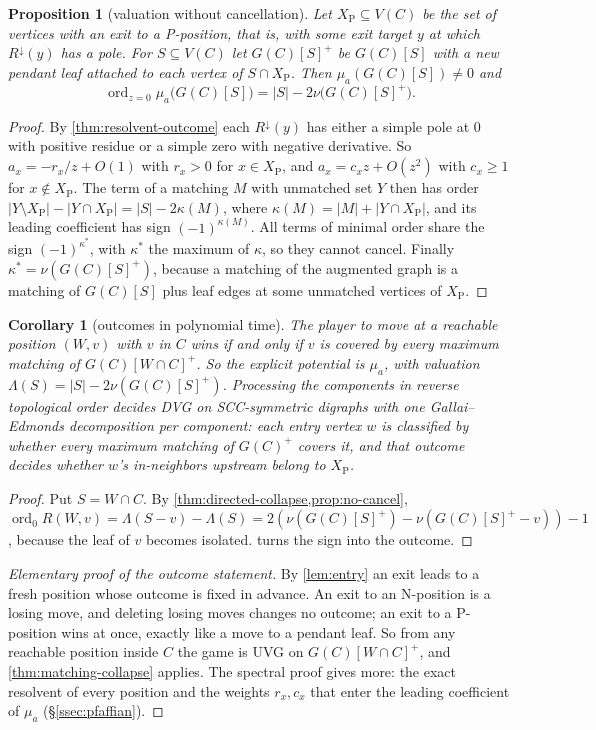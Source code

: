 \documentclass[11pt]{amsart}
\theoremstyle{plain}
\newtheorem{proposition}[theorem]{Proposition}
\newtheorem{corollary}[theorem]{Corollary}
\theoremstyle{definition}
\theoremstyle{remark}
\numberwithin{equation}{section}
\newcommand{\ord}{\operatorname{ord}}
\newcommand{\Rdown}{R^{\downarrow}}
\newcommand{\Pw}{\mathrm{P}}   %
\begin{document}
\begin{proposition}[valuation without cancellation]\label{prop:no-cancel}
Let $X_{\Pw}\subseteq V(C)$ be the set of vertices with an exit to a P-position, that is, with some exit target $y$ at which $\Rdown(y)$ has a pole. For $S\subseteq V(C)$ let $G(C)[S]^{+}$ be $G(C)[S]$ with a new pendant leaf attached to each vertex of $S\cap X_{\Pw}$. Then $\mu_a(G(C)[S])\neq0$ and
\[
\ord_{z=0}\mu_a\bigl(G(C)[S]\bigr)=|S|-2\nu\bigl(G(C)[S]^{+}\bigr).
\]
\end{proposition}
\begin{proof}
By \cref{thm:resolvent-outcome} each $\Rdown(y)$ has either a simple pole at $0$ with positive residue or a simple zero with negative derivative. So $a_x=-r_x/z+O(1)$ with $r_x>0$ for $x\in X_{\Pw}$, and $a_x=c_xz+O(z^2)$ with $c_x\ge1$ for $x\notin X_{\Pw}$. The term of a matching $M$ with unmatched set $Y$ then has order $|Y\setminus X_{\Pw}|-|Y\cap X_{\Pw}|=|S|-2\kappa(M)$, where $\kappa(M)=|M|+|Y\cap X_{\Pw}|$, and its leading coefficient has sign $(-1)^{\kappa(M)}$. All terms of minimal order share the sign $(-1)^{\kappa^{*}}$, with $\kappa^{*}$ the maximum of $\kappa$, so they cannot cancel. Finally $\kappa^{*}=\nu(G(C)[S]^{+})$, because a matching of the augmented graph is a matching of $G(C)[S]$ plus leaf edges at some unmatched vertices of $X_{\Pw}$.
\end{proof}

\begin{corollary}[outcomes in polynomial time]\label{cor:dvg-poly}
The player to move at a reachable position $(W,v)$ with $v$ in $C$ wins if and only if $v$ is covered by every maximum matching of $G(C)[W\cap C]^{+}$. So the explicit potential is $\mu_a$, with valuation $\Lambda(S)=|S|-2\nu(G(C)[S]^{+})$. Processing the components in reverse topological order decides DVG on SCC-symmetric digraphs with one Gallai--Edmonds decomposition per component: each entry vertex $w$ is classified by whether every maximum matching of $G(C)^{+}$ covers it, and that outcome decides whether $w$'s in-neighbors upstream belong to $X_{\Pw}$.
\end{corollary}
\begin{proof}
Put $S=W\cap C$. By \cref{thm:directed-collapse,prop:no-cancel}, $\ord_0R(W,v)=\Lambda(S-v)-\Lambda(S)=2(\nu(G(C)[S]^{+})-\nu(G(C)[S]^{+}-v))-1$, because the leaf of $v$ becomes isolated.  turns the sign into the outcome.
\end{proof}

\begin{proof}[Elementary proof of the outcome statement]
By \cref{lem:entry} an exit leads to a fresh position whose outcome is fixed in advance. An exit to an N-position is a losing move, and deleting losing moves changes no outcome; an exit to a P-position wins at once, exactly like a move to a pendant leaf. So from any reachable position inside $C$ the game is UVG on $G(C)[W\cap C]^{+}$, and \cref{thm:matching-collapse} applies. The spectral proof gives more: the exact resolvent of every position and the weights $r_x,c_x$ that enter the leading coefficient of $\mu_a$ (\S\ref{ssec:pfaffian}).
\end{proof}
\end{document}
